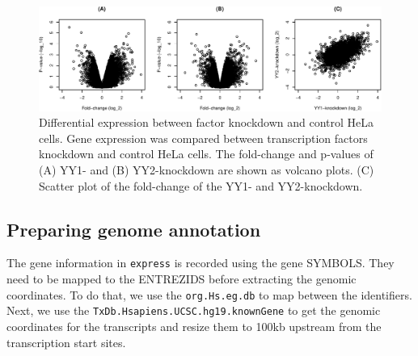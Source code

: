 \documentclass[9pt,a4paper,]{extarticle}
\begin{document}
\begin{figure}

{\centering \includegraphics[width=1\linewidth]{targetFlow_files/figure-latex/foldchange-1} 

}

\caption{Differential expression between factor knockdown and control HeLa cells. Gene expression was compared between transcription factors knockdown and control HeLa cells. The fold-change and p-values of (A) YY1- and (B) YY2-knockdown are shown as volcano plots. (C) Scatter plot of the fold-change of the YY1- and YY2-knockdown.}\label{fig:foldchange}
\end{figure}

\hypertarget{preparing-genome-annotation}{%
\subsection{Preparing genome annotation}\label{preparing-genome-annotation}}

The gene information in \texttt{express} is recorded using the gene SYMBOLS. They need to be mapped to the ENTREZIDS before extracting the genomic coordinates. To do that, we use the \texttt{org.Hs.eg.db} to map between the identifiers. Next, we use the \texttt{TxDb.Hsapiens.UCSC.hg19.knownGene} to get the genomic coordinates for the transcripts and resize them to 100kb upstream from the transcription start sites.
\end{document}
